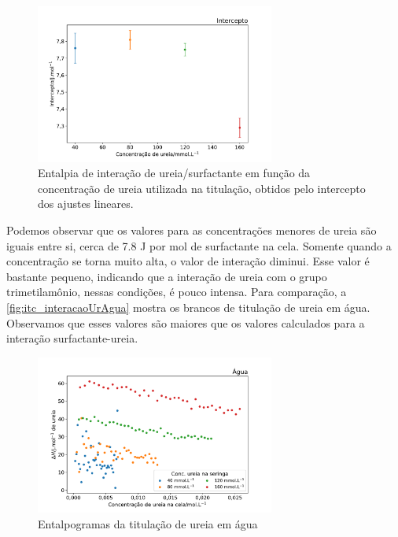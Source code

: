 \begin{figure}[h]
	\centering
	\includegraphics[width=0.7\textwidth]{imagens/itc/interacao_intercepto}
	\caption{Entalpia de interação de ureia/surfactante em função da concentração de ureia utilizada na titulação, obtidos pelo intercepto dos ajustes lineares.}
	\label{fig:itc_interacaoUrSurf_intercepto}
\end{figure}

	Podemos observar que os valores para as concentrações menores de ureia são iguais entre si, cerca de 7.8 J por mol de surfactante na cela. Somente quando a concentração se torna muito alta, o valor de interação diminui. Esse valor é bastante pequeno, indicando que a interação de ureia com o grupo trimetilamônio, nessas condições, é pouco intensa. Para comparação, a \autoref{fig:itc_interacaoUrAgua} mostra os brancos de titulação de ureia em água. Observamos que esses valores são maiores que os valores calculados para a interação surfactante-ureia.
	

\begin{figure}[h]
	\centering
	\includegraphics[width=0.7\textwidth]{imagens/itc/interacao_branco}
	\caption{Entalpogramas da titulação de ureia em água}
	\label{fig:itc_interacaoUrAgua}
\end{figure}
	
